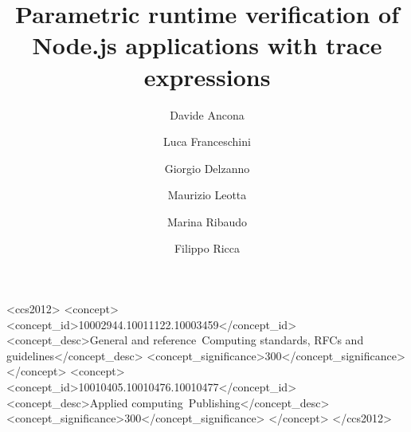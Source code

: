 \documentclass[english,submission]{programming}
\begin{document}
\title{Parametric runtime verification of Node.js applications with trace expressions}
\subtitle{}%

\author{Davide Ancona}
\author{Luca Franceschini}
\author{Giorgio Delzanno}
\author{Maurizio Leotta}
\author{Marina Ribaudo}
\author{Filippo Ricca}






\begin{CCSXML}
<ccs2012>
<concept>
<concept_id>10002944.10011122.10003459</concept_id>
<concept_desc>General and reference~Computing standards, RFCs and guidelines</concept_desc>
<concept_significance>300</concept_significance>
</concept>
<concept>
<concept_id>10010405.10010476.10010477</concept_id>
<concept_desc>Applied computing~Publishing</concept_desc>
<concept_significance>300</concept_significance>
</concept>
</ccs2012>
\end{CCSXML}
\end{document}
